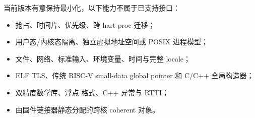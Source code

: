\documentclass[../dayan_kernel_manual.tex]{subfiles}
\begin{document}
当前版本有意保持最小化，以下能力不属于已支持接口：

\begin{itemize}
  \item 抢占、时间片、优先级、跨 hart proc 迁移；
  \item 用户态/内核态隔离、独立虚拟地址空间或 POSIX 进程模型；
  \item 文件、网络、标准输入、环境变量、时间与完整 locale；
  \item ELF TLS、传统 RISC-V small-data global pointer 和 C/C++ 全局构造器；
  \item 双精度数学库、浮点  格式、C++ 异常与 RTTI；
  \item 由固件链接器静态分配的跨核 coherent 对象。
\end{itemize}
\end{document}
